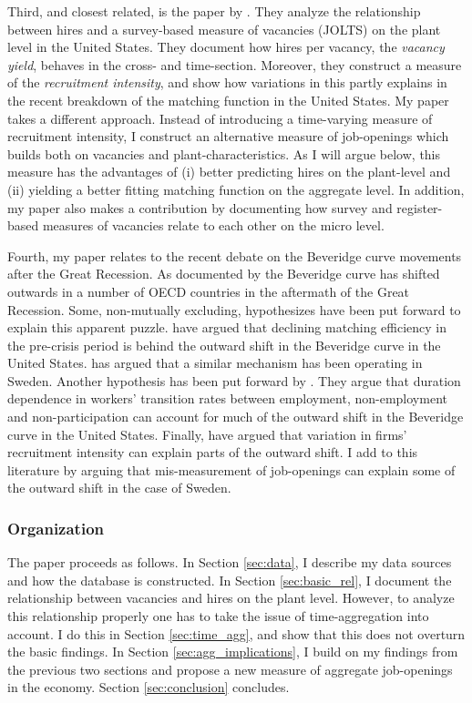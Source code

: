 Third, and closest related, is the paper by \cite{Davis2013}. They analyze the relationship between hires and a survey-based measure of vacancies (JOLTS) on the plant level in the United States. They document how hires per vacancy, the \emph{vacancy yield}, behaves in the cross- and time-section. Moreover, they construct a measure of the \emph{recruitment intensity}, and show how variations in this partly explains in the recent breakdown of the matching function in the United States. My paper takes a different approach. Instead of introducing a time-varying measure of recruitment intensity, I construct an alternative measure of job-openings which builds both on vacancies and plant-characteristics. As I will argue below, this measure has the advantages of (i) better predicting hires on the plant-level and (ii) yielding a better fitting matching function on the aggregate level. In addition, my paper also makes a contribution by documenting how survey and register-based measures of vacancies relate to each other on the micro level. 

Fourth, my paper relates to the recent debate on the Beveridge curve movements after the Great Recession. As documented by \cite{Hobijn2012} the Beveridge curve has shifted outwards in a number of OECD countries in the aftermath of the Great Recession. Some, non-mutually excluding, hypothesizes have been put forward to explain this apparent puzzle. \cite{Hall2015} have argued that declining matching efficiency in the pre-crisis period is behind the outward shift in the Beveridge curve in the United States. \cite{Riksbank2012} has argued that a similar mechanism has been operating in Sweden. Another hypothesis has been put forward by \cite{Kroft2016}. They argue that duration dependence in workers' transition rates between employment, non-employment and non-participation can account for much of the outward shift in the Beveridge curve in the United States. Finally, \cite{Davis2013} have argued that variation in firms’ recruitment intensity can explain parts of the outward shift. I add to this literature by arguing that mis-measurement of job-openings can explain some of the outward shift in the case of Sweden. 

\subsubsection{Organization}

The paper proceeds as follows. In Section \ref{sec:data}, I describe my data sources and how the database is constructed. In Section \ref{sec:basic_rel}, I document the relationship between vacancies and hires on the plant level. However, to analyze this relationship properly one has to take the issue of time-aggregation into account. I do this in Section \ref{sec:time_agg}, and show that this does not overturn the basic findings. In Section \ref{sec:agg_implications}, I build on my findings from the previous two sections and propose a new measure of aggregate job-openings in the economy. Section \ref{sec:conclusion} concludes.
